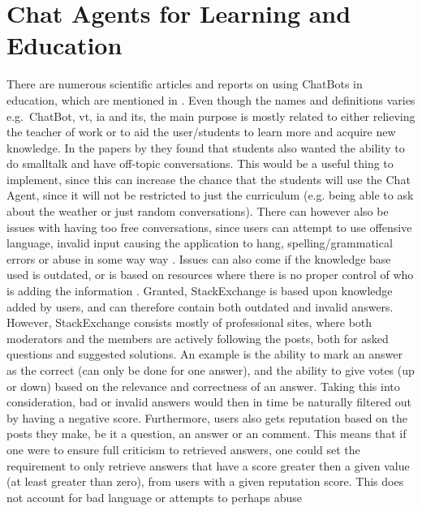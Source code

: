 \section{Chat Agents for Learning and Education}
\label{chapter3:learning_with_chatbots}
There are numerous scientific articles and reports on using ChatBots in education, which are mentioned in 
 \cite{Crutzen2011,Kerly2008,Knill2004,Kowalski2013,Jia2009,Gulenko,Imran2014,Kerly2007,Reed2011,Rossi2011}. Even though the names and definitions varies e.g.~ChatBot, \gls{vt}, 
\gls{ia} and \gls{its}, the main purpose is mostly related to either relieving the teacher of work or to aid the user/students to learn more and acquire new knowledge. In the 
papers by \cite{Kerly2008,Knill2004,Kerly2007} they found that students also wanted the ability to do smalltalk and have off-topic conversations. This would be a useful thing to implement, 
since this can increase the chance that the students will use the Chat Agent, since it will not be restricted to just the curriculum (e.g. being able to ask about the weather 
or just random conversations). There can however also be issues with having too free conversations, since users can attempt to use offensive language, invalid input causing 
the application to hang, spelling/grammatical errors or abuse in some way way \cite{Kerly2008}. Issues can also come if the knowledge base used is outdated, or is based on resources 
where there is no proper control of who is adding the information \cite{Knill2004,Imran2014,Reed2011}.
\vspace{0.5em}\newline
Granted, StackExchange is based upon knowledge added by users, and can therefore contain both outdated and invalid answers. However, StackExchange consists mostly of professional 
sites, where both moderators and the members are actively following the posts, both for asked questions and suggested solutions. An example is the ability to mark an answer as 
the correct (can only be done for one answer), and the ability to give votes (up or down) based on the relevance and correctness of an answer. Taking this into consideration, 
bad or invalid answers would then in time be naturally filtered out by having a negative score. Furthermore, users also gets reputation based on the posts they make, be it a 
question, an answer or an comment. This means that if one were to ensure full criticism to retrieved answers, one could set the requirement to only retrieve answers that have 
a score greater then a given value (at least greater than zero), from users with a given reputation score. This does not account for bad language or attempts to perhaps abuse 
